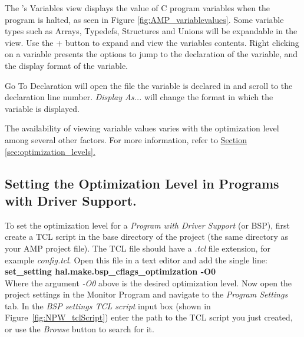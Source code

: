 \documentclass[11pt, twoside, pdftex]{article}
\begin{document}
The \productNameMed's  {\sf Variables} view displays the value of C program variables when the program is halted, as seen in Figure \ref{fig:AMP_variablevalues}.
Some variable types such as Arrays,  Typedefs, Structures and Unions will be expandable in the view. Use the {\sf +} button to 
expand and view the variables contents. Right clicking on a variable presents the options to jump to the declaration of the variable,
and the display format of the variable.

{\sf Go To Declaration} will open the file the variable is declared in and scroll to the declaration line number.
{\it Display As...} will change the format in which the variable is displayed.

The availability of viewing variable values varies with the optimization level among several other factors. For more information, refer to
\hyperref[sec:optimization_levels]{Section \ref{sec:optimization_levels}.}

\subsection{Setting the Optimization Level in Programs with Driver Support.}
To set the optimization level for a {\it Program with Driver Support} (or BSP), first create a TCL script in the base directory of the project (the same directory as your AMP project file). The TCL file should have a {\it .tcl} file extension, for example {\it config.tcl}. Open this file in a text editor and add the single line:\\
{\bf set\_setting hal.make.bsp\_cflags\_optimization -O0}\\
Where the argument {\it -O0} above is the desired optimization level. Now open the project settings in the Monitor Program and navigate to the {\it Program Settings} tab. In the {\it BSP settings TCL script} input box (shown in Figure~\ref{fig:NPW_tclScript}) enter the path to the TCL script you just created, or use the {\it Browse} button to search for it.
\end{document}
